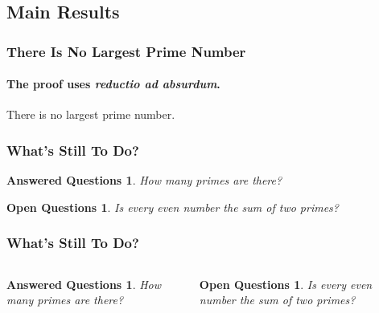 \documentclass[aspectratio=169]{beamer}
\newtheorem{answeredquestions}[theorem]{Answered Questions}
\newtheorem{openquestions}[theorem]{Open Questions}
\begin{document}
{\subsection{Main Results}

\begin{frame}[c]
  \frametitle{There Is No Largest Prime Number}
  \framesubtitle{The proof uses \textit{reductio ad absurdum}.}
  \begin{theorem}
    There is no largest prime number.
  \end{theorem}
\end{frame}

\begin{frame}
  \frametitle{What's Still To Do?}
  \begin{answeredquestions}
    How many primes are there?
  \end{answeredquestions}
  \begin{openquestions}
    Is every even number the sum of two primes?
  \end{openquestions}
\end{frame}

\begin{frame}
	\frametitle{What's Still To Do?}
\begin{columns}[t]
  \begin{answeredquestions}
    How many primes are there?
  \end{answeredquestions}

\pause
  \begin{openquestions}
    Is every even number the sum of two primes?\cite{Goldbach1742}
  \end{openquestions}
\end{columns}
\end{frame}

}
\end{document}
